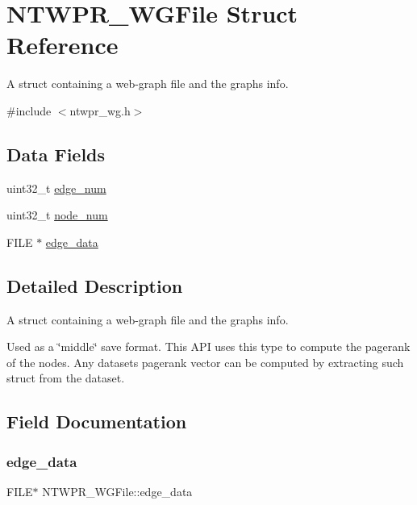 \hypertarget{structNTWPR__WGFile}{}\section{N\+T\+W\+P\+R\+\_\+\+W\+G\+File Struct Reference}
\label{structNTWPR__WGFile}


A struct containing a web-\/graph file and the graphs info.  




{\ttfamily \#include $<$ntwpr\+\_\+wg.\+h$>$}

\subsection*{Data Fields}
\begin{DoxyCompactItemize}
\item 
uint32\+\_\+t \mbox{\hyperlink{structNTWPR__WGFile_a76b00f9ef8cd1938f7b9ece2db7c686d}{edge\+\_\+num}}
\item 
uint32\+\_\+t \mbox{\hyperlink{structNTWPR__WGFile_a473237730653419df2494e0f2f52995c}{node\+\_\+num}}
\item 
F\+I\+LE $\ast$ \mbox{\hyperlink{structNTWPR__WGFile_a00a45d3ce6764e40dcc382f3c5e3c8e9}{edge\+\_\+data}}
\end{DoxyCompactItemize}


\subsection{Detailed Description}
A struct containing a web-\/graph file and the graphs info. 

Used as a \char`\"{}middle\char`\"{} save format. This A\+PI uses this type to compute the pagerank of the nodes. Any dataset\textquotesingle{}s pagerank vector can be computed by extracting such struct from the dataset. 

\subsection{Field Documentation}
\mbox{\label{structNTWPR__WGFile_a00a45d3ce6764e40dcc382f3c5e3c8e9}} 
\subsubsection{\texorpdfstring{edge\+\_\+data}{edge\_data}}
{\footnotesize\ttfamily F\+I\+LE$\ast$ N\+T\+W\+P\+R\+\_\+\+W\+G\+File\+::edge\+\_\+data}

